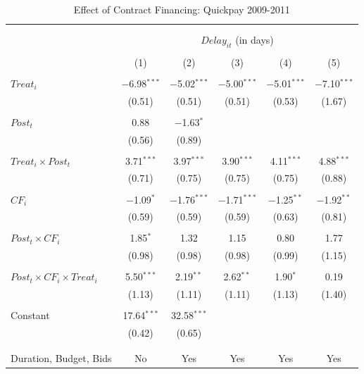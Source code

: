 \documentclass[
]{article}
\begin{document}
\begin{table}[H] \centering 
  \caption{Effect of Contract Financing: Quickpay 2009-2011} 
  \label{} 
\small 
\begin{tabular}{@{\extracolsep{-2pt}}lccccc} 
\\[-1.8ex]\hline 
\hline \\[-1.8ex] 
\\[-1.8ex] & \multicolumn{5}{c}{$Delay_{it}$ (in days)} \\ 
\\[-1.8ex] & (1) & (2) & (3) & (4) & (5)\\ 
\hline \\[-1.8ex] 
 $Treat_i$ & $-$6.98$^{***}$ & $-$5.02$^{***}$ & $-$5.00$^{***}$ & $-$5.01$^{***}$ & $-$7.10$^{***}$ \\ 
  & (0.51) & (0.51) & (0.51) & (0.53) & (1.67) \\ 
  & & & & & \\ 
 $Post_t$ & 0.88 & $-$1.63$^{*}$ &  &  &  \\ 
  & (0.56) & (0.89) &  &  &  \\ 
  & & & & & \\ 
 $Treat_i \times Post_t$ & 3.71$^{***}$ & 3.97$^{***}$ & 3.90$^{***}$ & 4.11$^{***}$ & 4.88$^{***}$ \\ 
  & (0.71) & (0.75) & (0.75) & (0.75) & (0.88) \\ 
  & & & & & \\ 
 $CF_i$ & $-$1.09$^{*}$ & $-$1.76$^{***}$ & $-$1.71$^{***}$ & $-$1.25$^{**}$ & $-$1.92$^{**}$ \\ 
  & (0.59) & (0.59) & (0.59) & (0.63) & (0.81) \\ 
  & & & & & \\ 
 $Post_t \times CF_i$ & 1.85$^{*}$ & 1.32 & 1.15 & 0.80 & 1.77 \\ 
  & (0.98) & (0.98) & (0.98) & (0.99) & (1.15) \\ 
  & & & & & \\ 
 $Post_t \times CF_i \times Treat_i$ & 5.50$^{***}$ & 2.19$^{**}$ & 2.62$^{**}$ & 1.90$^{*}$ & 0.19 \\ 
  & (1.13) & (1.11) & (1.11) & (1.13) & (1.40) \\ 
  & & & & & \\ 
 Constant & 17.64$^{***}$ & 32.58$^{***}$ &  &  &  \\ 
  & (0.42) & (0.65) &  &  &  \\ 
  & & & & & \\ 
\hline \\[-1.8ex] 
Duration, Budget, Bids & No & Yes & Yes & Yes & Yes \\ 

\end{tabular}
\end{table}
\end{document}
